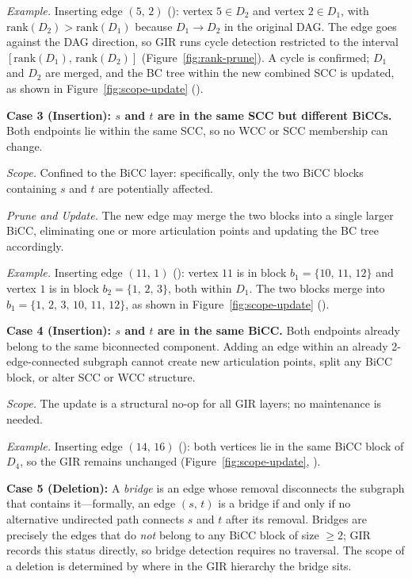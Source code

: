 \textit{Example.}
Inserting edge $(5,\,2)$ (): vertex $5 \in D_2$ and vertex $2 \in D_1$, with $\mathrm{rank}(D_2) > \mathrm{rank}(D_1)$ because $D_1 \to D_2$ in the original DAG.
The edge goes against the DAG direction, so GIR runs cycle detection restricted to the interval $[\mathrm{rank}(D_1),\,\mathrm{rank}(D_2)]$ (Figure~\ref{fig:rank-prune}).
A cycle is confirmed; $D_1$ and $D_2$ are merged, and the BC tree within the new combined SCC is updated, as shown in Figure~\ref{fig:scope-update} ().

\textbf{Case 3 (Insertion): $s$ and $t$ are in the same SCC but different BiCCs.}
Both endpoints lie within the same SCC, so no WCC or SCC membership can change.

\textit{Scope.} Confined to the BiCC layer: specifically, only the two BiCC blocks containing $s$ and $t$ are potentially affected.

\textit{Prune and Update.} The new edge may merge the two blocks into a single larger BiCC, eliminating one or more articulation points and updating the BC tree accordingly.

\textit{Example.}
Inserting edge $(11,\,1)$ (): vertex $11$ is in block $b_1 = \{10,\,11,\,12\}$ and vertex $1$ is in block $b_2 = \{1,\,2,\,3\}$, both within $D_1$.
The two blocks merge into $b_1 = \{1,\,2,\,3,\,10,\,11,\,12\}$, as shown in Figure~\ref{fig:scope-update} ().

\textbf{Case 4 (Insertion): $s$ and $t$ are in the same BiCC.}
Both endpoints already belong to the same biconnected component.
Adding an edge within an already 2-edge-connected subgraph cannot create new articulation points, split any BiCC block, or alter SCC or WCC structure.

\textit{Scope.} The update is a structural no-op for all GIR layers; no maintenance is needed.

\textit{Example.}
Inserting edge $(14,\,16)$ (): both vertices lie in the same BiCC block of $D_4$, so the GIR remains unchanged (Figure~\ref{fig:scope-update}, ).

\textbf{Case 5 (Deletion):}
A \emph{bridge} is an edge whose removal disconnects the subgraph that contains it---formally, an edge $(s,\,t)$ is a bridge if and only if no alternative undirected path connects $s$ and $t$ after its removal.
Bridges are precisely the edges that do \emph{not} belong to any BiCC block of size $\geq 2$; GIR records this status directly, so bridge detection requires no traversal.
The scope of a deletion is determined by where in the GIR hierarchy the bridge sits.

